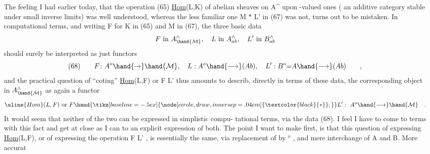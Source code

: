 
The feeling I had earlier today,  that the  operation (65)
\uline{Hom}(L,K)  of abelian sheaves on A\^{} upon -valued ones ( an additive
category stable under small  inverse limits) was well understood,
whereas the less familiar one  M $*$ L'  in (67) was not,  turns out to be
mistaken.  In computational terms,  and writing F for K in (65) and M in
(67),  the three basic data
\[ F \text{ in } A^{\wedge}_{\hand{\mathcal{M}}} , \quad L \text{ in } A^{\wedge}_{ab} , \quad L' \text{ in } B^{\wedge}_{ab} \]
should surely be interpreted as just functors
\[ (68) \qquad F\colon A^{o} \hand{\rightarrow} \hand{\mathcal{M}} , \quad L : A^{o} \hand{\longrightarrow} (Ab) , \quad L' : B^{o}{=}A \hand{\longrightarrow} (Ab) \qquad , \]
and the  practical question of ``coting''  \uline{Hom}(L,F) or  F \hand{$\mathbin{\tikz[baseline=-.5ex]{\node[circle,draw,inner sep=.04em] {\ensuremath{\textcolor{black}{*}}};}}$} L'  thus
amounts to describ, directly in terms of these data,  the corresponding
object in $A^{\wedge}_{\hand{\mathcal{M}}}$  as again a functor
\[ \uline{Hom}(L,F) \text{ or } F \hand{\mathbin{\tikz[baseline=-.5ex]{\node[circle,draw,inner sep=.04em] {\ensuremath{\textcolor{black}{*}}};}}} L' : \ A^{o} \hand{\longrightarrow} \hand{\mathcal{M}} \quad . \]
It would seem that neither of the two can be expressed in simplistic compu-%
tational terms,  via the data (68).  I feel I have to come to terms with
this fact and get at close as I can to an explicit expression of both. The
point I want to make first,  is that this question of expressing \uline{Hom}(L,F),
or of expressing the operation F \hand{$\mathbin{\tikz[baseline=-.5ex]{\node[circle,draw,inner sep=.04em] {\ensuremath{\textcolor{black}{*}}};}}$} L' ,  is essentially the same,  via
replacement of  by $^{o}$ ,  and mere interchange of A and B.  More accurat

